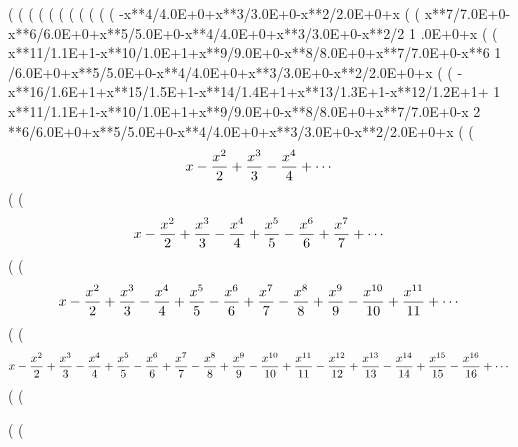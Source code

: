 (%
(%
(%
(%
(%
(%
(%
(%
(%
(%
(%
      -x**4/4.0E+0+x**3/3.0E+0-x**2/2.0E+0+x
(%
(%
      x**7/7.0E+0-x**6/6.0E+0+x**5/5.0E+0-x**4/4.0E+0+x**3/3.0E+0-x**2/2
     1   .0E+0+x
(%
(%
      x**11/1.1E+1-x**10/1.0E+1+x**9/9.0E+0-x**8/8.0E+0+x**7/7.0E+0-x**6
     1   /6.0E+0+x**5/5.0E+0-x**4/4.0E+0+x**3/3.0E+0-x**2/2.0E+0+x
(%
(%
      -x**16/1.6E+1+x**15/1.5E+1-x**14/1.4E+1+x**13/1.3E+1-x**12/1.2E+1+
     1   x**11/1.1E+1-x**10/1.0E+1+x**9/9.0E+0-x**8/8.0E+0+x**7/7.0E+0-x
     2   **6/6.0E+0+x**5/5.0E+0-x**4/4.0E+0+x**3/3.0E+0-x**2/2.0E+0+x
(%
(%
$$x-{{x^2}\over{2}}+{{x^3}\over{3}}-{{x^4}\over{4}}+\cdots $$
(%
(%
$$x-{{x^2}\over{2}}+{{x^3}\over{3}}-{{x^4}\over{4}}+{{x^5}\over{5}}-
 {{x^6}\over{6}}+{{x^7}\over{7}}+\cdots $$
(%
(%
$$x-{{x^2}\over{2}}+{{x^3}\over{3}}-{{x^4}\over{4}}+{{x^5}\over{5}}-
 {{x^6}\over{6}}+{{x^7}\over{7}}-{{x^8}\over{8}}+{{x^9}\over{9}}-{{x
 ^{10}}\over{10}}+{{x^{11}}\over{11}}+\cdots $$
(%
(%
$$x-{{x^2}\over{2}}+{{x^3}\over{3}}-{{x^4}\over{4}}+{{x^5}\over{5}}-
 {{x^6}\over{6}}+{{x^7}\over{7}}-{{x^8}\over{8}}+{{x^9}\over{9}}-{{x
 ^{10}}\over{10}}+{{x^{11}}\over{11}}-{{x^{12}}\over{12}}+{{x^{13}
 }\over{13}}-{{x^{14}}\over{14}}+{{x^{15}}\over{15}}-{{x^{16}}\over{
 16}}+\cdots $$
(%
(%

(%
(%
